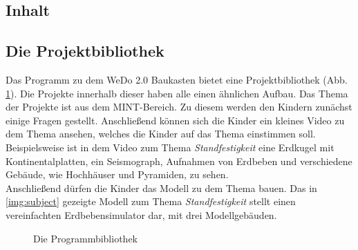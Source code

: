 \subsection{Inhalt}

\subsection{Die Projektbibliothek}\label{Projektbibliothek}
Das Programm zu dem WeDo 2.0 Baukasten bietet eine Projektbibliothek (Abb. \ref{img:projects}). Die Projekte innerhalb dieser haben alle einen ähnlichen Aufbau. Das Thema der Projekte ist aus dem \gls{MINT}-Bereich. Zu diesem werden den Kindern zunächst einige Fragen gestellt. Anschließend können sich die Kinder ein kleines Video zu dem Thema ansehen, welches die Kinder auf das Thema einstimmen soll. Beispielsweise ist in dem Video zum Thema \textit{Standfestigkeit} eine Erdkugel mit Kontinentalplatten, ein Seismograph, Aufnahmen von Erdbeben und verschiedene Gebäude, wie Hochhäuser und Pyramiden, zu sehen.\\
Anschließend dürfen die Kinder das Modell zu dem Thema bauen. Das in \ref{img:subject} gezeigte Modell zum Thema \textit{Standfestigkeit} stellt einen vereinfachten Erdbebensimulator dar, mit drei Modellgebäuden.\\
\begin{figure}[htbp!]
	\centering
	\caption[Die Programmbibliothek]{Die Programmbibliothek}
	\label{img:projects}
\end{figure} 

